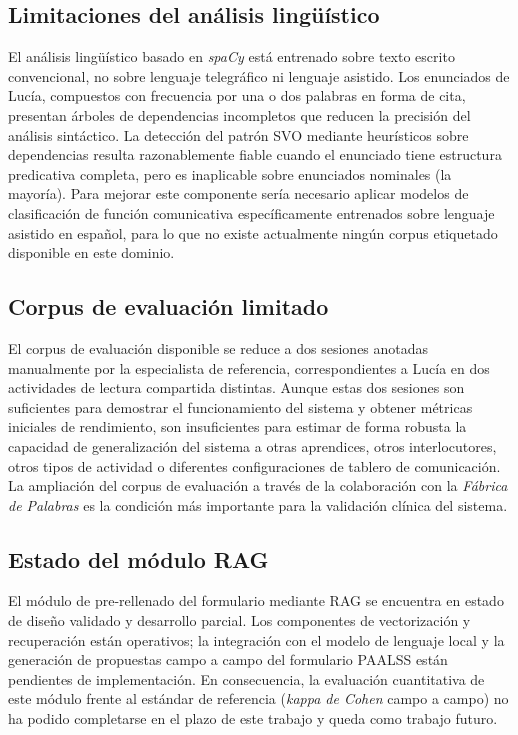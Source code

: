 \subsection{Limitaciones del análisis lingüístico}
\label{subsec:lim_nlp}

El análisis lingüístico basado en \emph{spaCy} está entrenado sobre texto escrito
convencional, no sobre lenguaje telegráfico ni lenguaje asistido. Los enunciados de
Lucía, compuestos con frecuencia por una o dos palabras en forma de cita, presentan
árboles de dependencias incompletos que reducen la precisión del análisis sintáctico.
La detección del patrón \ac{SVO} mediante heurísticos sobre dependencias resulta
razonablemente fiable cuando el enunciado tiene estructura predicativa completa, pero
es inaplicable sobre enunciados nominales (la mayoría). Para mejorar este componente
sería necesario aplicar modelos de clasificación de función comunicativa específicamente
entrenados sobre lenguaje asistido en español, para lo que no existe actualmente ningún
corpus etiquetado disponible en este dominio.

\subsection{Corpus de evaluación limitado}
\label{subsec:lim_corpus}

El corpus de evaluación disponible se reduce a dos sesiones anotadas manualmente por la
especialista de referencia, correspondientes a Lucía en dos actividades de lectura
compartida distintas. Aunque estas dos sesiones son suficientes para demostrar el
funcionamiento del sistema y obtener métricas iniciales de rendimiento, son insuficientes
para estimar de forma robusta la capacidad de generalización del sistema a otras
aprendices, otros interlocutores, otros tipos de actividad o diferentes configuraciones
de tablero de comunicación. La ampliación del corpus de evaluación a través de la
colaboración con la \emph{Fábrica de Palabras} es la condición más importante para
la validación clínica del sistema.

\subsection{Estado del módulo RAG}
\label{subsec:lim_rag}

El módulo de pre-rellenado del formulario mediante \ac{RAG} se encuentra en estado de
diseño validado y desarrollo parcial. Los componentes de vectorización y recuperación
están operativos; la integración con el modelo de lenguaje local y la generación de
propuestas campo a campo del formulario \ac{PAALSS} están pendientes de implementación.
En consecuencia, la evaluación cuantitativa de este módulo frente al estándar de
referencia (\emph{kappa de Cohen} campo a campo) no ha podido completarse en el
plazo de este trabajo y queda como trabajo futuro.


